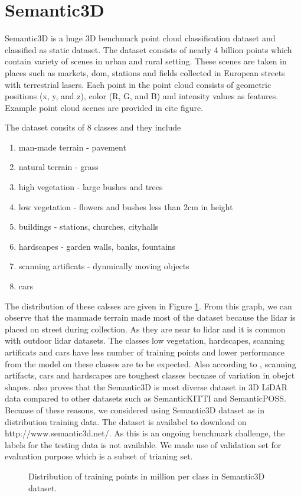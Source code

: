 \newpage
\section{Semantic3D}
Semantic3D is a huge 3D benchmark point cloud classification dataset and classified as static dataset.
The dataset consists of nearly 4 billion points which contain variety of scenes in urban and rural setting.
These scenes are taken in places such as markets, dom, stations and fields collected in European streets with terrestrial lasers.
Each point in the point cloud consists of geometric positions (x, y, and z), color (R, G, and B) and intensity values as features.
Example point cloud scenes are provided in {cite figure}. 

The dataset consits of 8 classes and they include
\begin{enumerate}
    \item man-made terrain - pavement
    \item natural terrain - grass
    \item high vegetation - large bushes and trees
    \item low vegetation - flowers and bushes less than 2cm in height
    \item buildings - stations, churches, cityhalls
    \item hardscapes - garden walls, banks, fountains
    \item scanning artificats - dynmically moving objects
    \item cars
\end{enumerate}
The distribution of these calsses are given in Figure \ref{fig:sem3ddist}.
From this graph, we can observe that the manmade terrain made most of the dataset because the lidar is placed on street during collection.
As they are near to lidar and it is common with outdoor lidar datasets.
The classes low vegetation, hardscapes, scanning artificats and cars have less number of training points and lower performance from the model on these classes are to be expected.
Also according to \cite{hackel2017semantic3d}, scanning artifacts, cars and hardscapes are toughest classes becuase of variation in obejct shapes.
\cite{survey3d} also proves that the Semantic3D is most diverse dataset in 3D LiDAR data compared to other datasets such as SemanticKITTI and SemanticPOSS.
Becuase of these reasons, we considered using Semantic3D dataset as in distribution training data.
The dataset is availabel to download on http://www.semantic3d.net/. 
As this is an ongoing benchmark challenge, the labels for the testing data is not available.
We made use of validation set for evaluation purpose which is a subset of trianing set.
\begin{figure}[h!]
    \centering
    
    \caption{Distribution of training points in million per class in Semantic3D dataset.}
    \label{fig:sem3ddist}
\end{figure}

